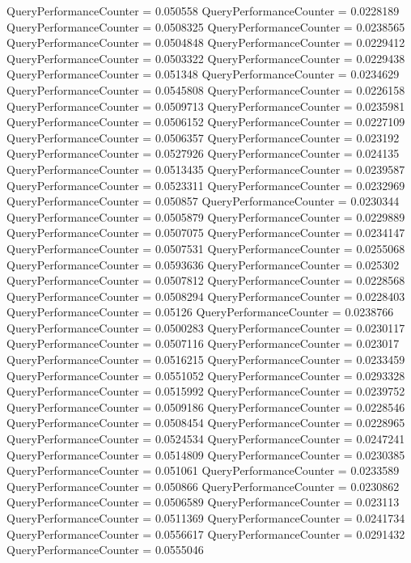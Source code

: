 \documentclass[9pt]{article}
\theoremstyle{plain}
\theoremstyle{definition}
\theoremstyle{remark}
\numberwithin{equation}{section}
\begin{document}
QueryPerformanceCounter  =  0.050558
QueryPerformanceCounter  =  0.0228189
QueryPerformanceCounter  =  0.0508325
QueryPerformanceCounter  =  0.0238565
QueryPerformanceCounter  =  0.0504848
QueryPerformanceCounter  =  0.0229412
QueryPerformanceCounter  =  0.0503322
QueryPerformanceCounter  =  0.0229438
QueryPerformanceCounter  =  0.051348
QueryPerformanceCounter  =  0.0234629
QueryPerformanceCounter  =  0.0545808
QueryPerformanceCounter  =  0.0226158
QueryPerformanceCounter  =  0.0509713
QueryPerformanceCounter  =  0.0235981
QueryPerformanceCounter  =  0.0506152
QueryPerformanceCounter  =  0.0227109
QueryPerformanceCounter  =  0.0506357
QueryPerformanceCounter  =  0.023192
QueryPerformanceCounter  =  0.0527926
QueryPerformanceCounter  =  0.024135
QueryPerformanceCounter  =  0.0513435
QueryPerformanceCounter  =  0.0239587
QueryPerformanceCounter  =  0.0523311
QueryPerformanceCounter  =  0.0232969
QueryPerformanceCounter  =  0.050857
QueryPerformanceCounter  =  0.0230344
QueryPerformanceCounter  =  0.0505879
QueryPerformanceCounter  =  0.0229889
QueryPerformanceCounter  =  0.0507075
QueryPerformanceCounter  =  0.0234147
QueryPerformanceCounter  =  0.0507531
QueryPerformanceCounter  =  0.0255068
QueryPerformanceCounter  =  0.0593636
QueryPerformanceCounter  =  0.025302
QueryPerformanceCounter  =  0.0507812
QueryPerformanceCounter  =  0.0228568
QueryPerformanceCounter  =  0.0508294
QueryPerformanceCounter  =  0.0228403
QueryPerformanceCounter  =  0.05126
QueryPerformanceCounter  =  0.0238766
QueryPerformanceCounter  =  0.0500283
QueryPerformanceCounter  =  0.0230117
QueryPerformanceCounter  =  0.0507116
QueryPerformanceCounter  =  0.023017
QueryPerformanceCounter  =  0.0516215
QueryPerformanceCounter  =  0.0233459
QueryPerformanceCounter  =  0.0551052
QueryPerformanceCounter  =  0.0293328
QueryPerformanceCounter  =  0.0515992
QueryPerformanceCounter  =  0.0239752
QueryPerformanceCounter  =  0.0509186
QueryPerformanceCounter  =  0.0228546
QueryPerformanceCounter  =  0.0508454
QueryPerformanceCounter  =  0.0228965
QueryPerformanceCounter  =  0.0524534
QueryPerformanceCounter  =  0.0247241
QueryPerformanceCounter  =  0.0514809
QueryPerformanceCounter  =  0.0230385
QueryPerformanceCounter  =  0.051061
QueryPerformanceCounter  =  0.0233589
QueryPerformanceCounter  =  0.050866
QueryPerformanceCounter  =  0.0230862
QueryPerformanceCounter  =  0.0506589
QueryPerformanceCounter  =  0.023113
QueryPerformanceCounter  =  0.0511369
QueryPerformanceCounter  =  0.0241734
QueryPerformanceCounter  =  0.0556617
QueryPerformanceCounter  =  0.0291432
QueryPerformanceCounter  =  0.0555046
\end{document}
